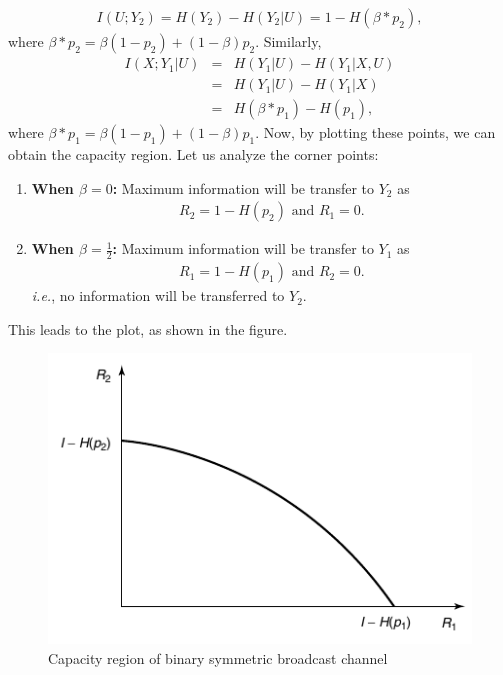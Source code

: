 %
\begin{eqnarray}
    I(U;Y_2) = H(Y_2)-H(Y_2|U) = 1-H(\beta * p_2),
\end{eqnarray}
%
where $\beta * p_2 = \beta(1-p_2)+(1-\beta)p_2$. Similarly,
%
\begin{eqnarray}
    I(X;Y_1|U) &=& H(Y_1|U)-H(Y_1|X,U) \nonumber\\
    &=& H(Y_1|U)-H(Y_1|X) \nonumber\\
    &=& H(\beta * p_1)-H(p_1),
\end{eqnarray}
%
where $\beta * p_1 = \beta(1-p_1)+(1-\beta)p_1$. Now, by plotting these points, we can obtain the capacity region. Let us analyze the corner points:
%
\begin{enumerate}
    \item \textbf{When $\beta = 0$:} Maximum information will be transfer to $Y_2$ as
    \begin{eqnarray*}
        R_2 = 1-H(p_2) \text{ and } R_1 = 0.
    \end{eqnarray*}

    \item \textbf{When $\beta = \frac{1}{2}$:} Maximum information will be transfer to $Y_1$ as
    \begin{eqnarray*}
        R_1 = 1-H(p_1) \text{ and } R_2 = 0.
    \end{eqnarray*}
    \textit{i.e.}, no information will be transferred to $Y_2$.
\end{enumerate}
%
This leads to the plot, as shown in the figure.
%
\begin{figure}[h]
    \centering
    \includegraphics[scale= 0.5]{Diagrams/CRBSBC.png}
    \caption{Capacity region of binary symmetric broadcast channel}
    \label{fig:CRBSBC}
\end{figure}
%
